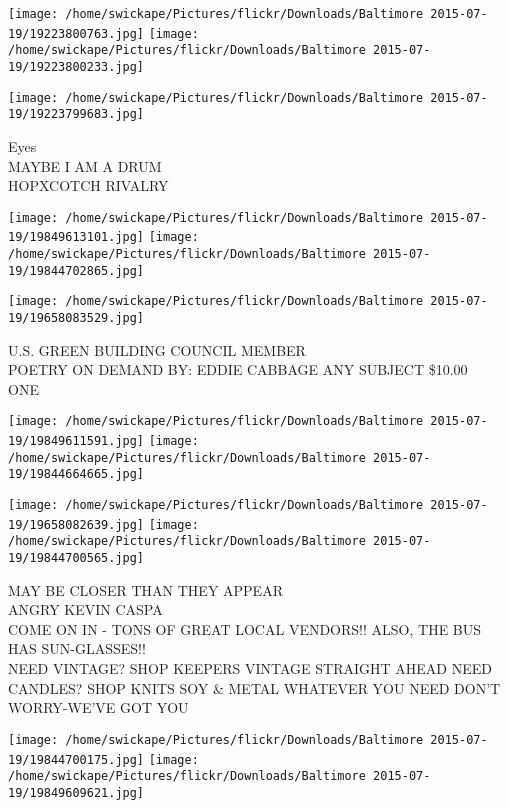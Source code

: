 \documentclass[10pt,letterpaper]{article}
\begin{document}
\texttt{[image: /home/swickape/Pictures/flickr/Downloads/Baltimore 2015-07-19/19223800763.jpg]}
\texttt{[image: /home/swickape/Pictures/flickr/Downloads/Baltimore 2015-07-19/19223800233.jpg]}

\vspace{0.25in}
\texttt{[image: /home/swickape/Pictures/flickr/Downloads/Baltimore 2015-07-19/19223799683.jpg]}

Eyes\\
MAYBE I AM A DRUM\\
HOPXCOTCH RIVALRY\\
\pagebreak

\texttt{[image: /home/swickape/Pictures/flickr/Downloads/Baltimore 2015-07-19/19849613101.jpg]}
\texttt{[image: /home/swickape/Pictures/flickr/Downloads/Baltimore 2015-07-19/19844702865.jpg]}

\vspace{0.25in}
\texttt{[image: /home/swickape/Pictures/flickr/Downloads/Baltimore 2015-07-19/19658083529.jpg]}

U.S. GREEN BUILDING COUNCIL MEMBER\\
POETRY ON DEMAND BY: EDDIE CABBAGE ANY SUBJECT \$10.00\\
ONE\\
\pagebreak

\texttt{[image: /home/swickape/Pictures/flickr/Downloads/Baltimore 2015-07-19/19849611591.jpg]}
\texttt{[image: /home/swickape/Pictures/flickr/Downloads/Baltimore 2015-07-19/19844664665.jpg]}

\texttt{[image: /home/swickape/Pictures/flickr/Downloads/Baltimore 2015-07-19/19658082639.jpg]}
\texttt{[image: /home/swickape/Pictures/flickr/Downloads/Baltimore 2015-07-19/19844700565.jpg]}

MAY BE CLOSER THAN THEY APPEAR\\
ANGRY KEVIN CASPA\\
COME ON IN {-} TONS OF GREAT LOCAL VENDORS!! ALSO, THE BUS HAS SUN{-}GLASSES!!\\
NEED VINTAGE?  SHOP KEEPERS VINTAGE STRAIGHT AHEAD NEED CANDLES? SHOP KNITS SOY \& METAL WHATEVER YOU NEED DON'T WORRY{-}WE'VE GOT YOU\\
\pagebreak

\texttt{[image: /home/swickape/Pictures/flickr/Downloads/Baltimore 2015-07-19/19844700175.jpg]}
\texttt{[image: /home/swickape/Pictures/flickr/Downloads/Baltimore 2015-07-19/19849609621.jpg]}
\end{document}
